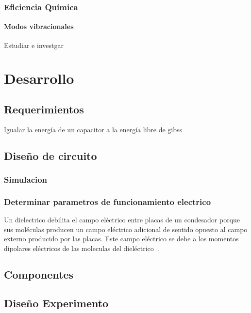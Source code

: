 \documentclass[12pt,twoside,onecolumn]{article}
\begin{document}
\subsubsection{Eficiencia Química}

\paragraph{Modos vibracionales}
Estudiar e investgar

\section{Desarrollo}

\subsection{Requerimientos}

Igualar la energía de un capacitor a la energía libre de gibss

\subsection{Diseño de circuito}

\subsubsection{Simulacion}


\subsubsection{Determinar parametros de funcionamiento electrico}
Un dielectrico debilita el campo eléctrico entre placas de un condesador porque sus moléculas producen un campo eléctrico adicional de sentido opuesto al campo externo producido por las placas. Este campo eléctrico se debe a los momentos dipolares eléctricos de las moleculas del dieléctrico~\cite{tipler2005fisica}.

\subsection{Componentes}

\subsection{Diseño Experimento}


\newpage

\end{document}

